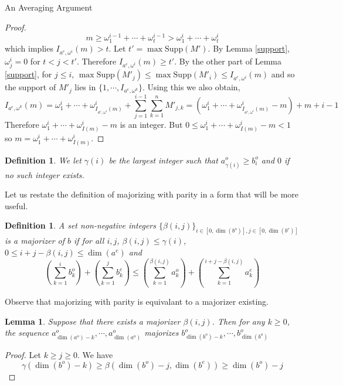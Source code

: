 \documentclass[11pt,a4paper]{article}
\newcounter{foo}
\newtheorem{lemma}[subsection]{Lemma}
\newtheorem{definition}[foo]{Definition}
\newcommand{\Supp}{\mathrm{Supp}}
\begin{document}
\begin{section}{An Averaging Argument}
\begin{proof}
\[
m \geq \omega^{i - 1}_1 + \cdots + \omega^{i - 1}_t > \omega^{i }_1 + \cdots + \omega^{i}_t
\]
which implies $I_{a^e, \omega^i} (m) > t$. Let $t' = \max \Supp(M')$. By Lemma \ref{support}, $\omega^i_j = 0$ for $t < j < t'$. Therefore $I_{a^e, \omega^i} (m) \geq t'$. By the other part of Lemma \ref{support}, for $j \leq i$, $\max \Supp(M'_j) \leq \max \Supp(M'_i) \leq I_{a^e, \omega^i}(m)$ and so the support of $M'_j$ lies in $\{1, \cdots, I_{a^e, \omega^k} \}$. Using this we also obtain,
\[
I_{a^e, \omega^k} (m) = \omega^i_1 + \cdots + \omega^i_{I_{a^e, \omega^i} (m)} + \sum_{j = 1}^{i - 1} \sum_{k = 1}^{n} M'_{j, k} = (\omega^i_1 + \cdots + \omega^i_{I_{a^e, \omega^i}(m)} - m) + m + i - 1
\]
Therefore $ \omega^i_1 + \cdots + \omega^i_{I(m)} - m $ is an integer. But $ 0 \leq \omega^i_1 + \cdots + \omega^i_{I(m)} - m < 1$ so $m = \omega^i_1 + \cdots + \omega^i_{I(m)}$.
\end{proof}
\begin{definition} We let $\gamma(i)$ be the largest integer such that $a^o_{\gamma(i)} \geq b^o_i$ and $0$ if no such integer exists.
\end{definition}

Let us restate the definition of majorizing with parity in a form that will be more useful.
\begin{definition} A set non-negative integers $\{ \beta(i, j) \}_{i \in [0, \dim(b^o)], j \in [0, \dim(b^e)]}$ is a majorizer of $b$ if for all $i, j$, $\beta(i, j) \leq \gamma(i)$, $0 \leq i + j - \beta(i,j) \leq \dim(a^e)$ and
\[
\left ( \sum_{k = 1}^i b^o_k \right ) + \left ( \sum_{k = 1}^j b^e_k \right ) \leq \left ( \sum_{k = 1}^{\beta(i, j)} a^o_k \right ) + \left (\sum_{k = 1}^{ i + j - \beta(i, j) } a^e_k \right )
\]
\end{definition}
Observe that majorizing with parity is equivalant to a majorizer existing.
\begin{lemma} \label{major_suffix} Suppose that there exists a majorizer $\beta(i, j)$. Then for any $k \geq 0$, the sequence $a^o_{\dim(a^o) - k}, \cdots, a^o_{\dim(a^o)}$ majorizes $b^o_{\dim(b^o) - k}, \cdots, b^o_{\dim(b^o)}$
\end{lemma}
\begin{proof} Let $k \geq j \geq 0$. We have
\[
\gamma( \dim(b^o) - k) \geq \beta( \dim(b^o) - j, \dim(b^e) ) \geq \dim(b^o) - j
\]
\end{proof}





\end{section}
\end{document}
